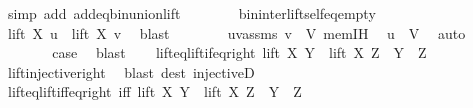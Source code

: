 \begin{isabellebody}
\ {\isacharparenleft}{\kern0pt}simp\ add{\isacharcolon}{\kern0pt}\ add{\isacharunderscore}{\kern0pt}eq{\isacharunderscore}{\kern0pt}bin{\isacharunderscore}{\kern0pt}union{\isacharunderscore}{\kern0pt}lift{\isacharparenright}{\kern0pt}\isanewline
\ \ \ \ \ \ \isamarkupfalse%
\ bin{\isacharunderscore}{\kern0pt}inter{\isacharunderscore}{\kern0pt}lift{\isacharunderscore}{\kern0pt}self{\isacharunderscore}{\kern0pt}eq{\isacharunderscore}{\kern0pt}empty\ \isamarkupfalse%
\ {\isachardoublequoteopen}lift\ X\ u\ {\isacharequal}{\kern0pt}\ lift\ X\ v{\isachardoublequoteclose}\ \isamarkupfalse%
\ blast\isanewline
\ \ \ \ \ \ \isamarkupfalse%
\ uvassms\ {\isacartoucheopen}v\ {\isasymin}\ V{\isacartoucheclose}\ mem{\isachardot}{\kern0pt}IH\ \isamarkupfalse%
\ {\isachardoublequoteopen}u\ {\isasymin}\ V{\isachardoublequoteclose}\ \isamarkupfalse%
\ auto\isanewline
\ \ \ \ \isacommand{{\isacharbraceright}{\kern0pt}}\isamarkupfalse%
\isanewline
\ \ \ \ \isamarkupfalse%
\ \isamarkupfalse%
\ {\isacharquery}{\kern0pt}case\ \isamarkupfalse%
\ blast\isanewline
\ \ \isamarkupfalse%
\isanewline
{}\isamarkupfalse%
%
\endisatagproof
{\isafoldproof}%
%
\isadelimproof
\isanewline
%
\endisadelimproof
\isanewline
{}\isamarkupfalse%
\ lift{\isacharunderscore}{\kern0pt}eq{\isacharunderscore}{\kern0pt}lift{\isacharunderscore}{\kern0pt}if{\isacharunderscore}{\kern0pt}eq{\isacharunderscore}{\kern0pt}right{\isacharcolon}{\kern0pt}\ {\isachardoublequoteopen}lift\ X\ Y\ {\isacharequal}{\kern0pt}\ lift\ X\ Z\ {\isasymLongrightarrow}\ Y\ {\isacharequal}{\kern0pt}\ Z{\isachardoublequoteclose}\isanewline
%
\isadelimproof
\ \ %
\endisadelimproof
%
\isatagproof
{}\isamarkupfalse%
\ lift{\isacharunderscore}{\kern0pt}injective{\isacharunderscore}{\kern0pt}right\ \isamarkupfalse%
\ {\isacharparenleft}{\kern0pt}blast\ dest{\isacharcolon}{\kern0pt}\ injectiveD{\isacharparenright}{\kern0pt}%
\endisatagproof
{\isafoldproof}%
%
\isadelimproof
\isanewline
%
\endisadelimproof
\isanewline
{}\isamarkupfalse%
\ lift{\isacharunderscore}{\kern0pt}eq{\isacharunderscore}{\kern0pt}lift{\isacharunderscore}{\kern0pt}iff{\isacharunderscore}{\kern0pt}eq{\isacharunderscore}{\kern0pt}right\ {\isacharbrackleft}{\kern0pt}iff{\isacharbrackright}{\kern0pt}{\isacharcolon}{\kern0pt}\ {\isachardoublequoteopen}lift\ X\ Y\ {\isacharequal}{\kern0pt}\ lift\ X\ Z\ {\isasymlongleftrightarrow}\ Y\ {\isacharequal}{\kern0pt}\ Z{\isachardoublequoteclose}\isanewline

\end{isabellebody}
